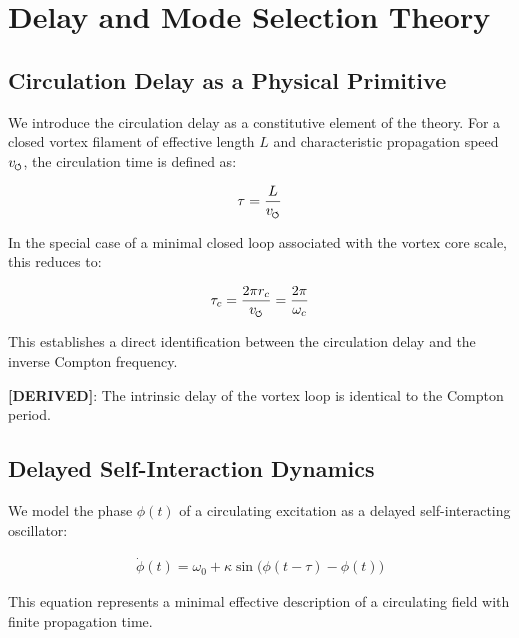 \section{Delay and Mode Selection Theory}
    \label{sec:delay}
    
    \subsection{Circulation Delay as a Physical Primitive}
        
        We introduce the circulation delay as a constitutive element of the theory.
        For a closed vortex filament of effective length $L$ and characteristic propagation speed $v_{\swirlarrow}$, the circulation time is defined as:
        
        \begin{align}
            \tau = \frac{L}{v_{\swirlarrow}}
            \label{eq:delay_time}
        \end{align}
        
        In the special case of a minimal closed loop associated with the vortex core scale, this reduces to:
        
        \begin{align}
            \tau_c = \frac{2\pi r_c}{v_{\swirlarrow}} = \frac{2\pi}{\omega_c}
            \label{eq:compton_delay}
        \end{align}
        
        This establishes a direct identification between the circulation delay and the inverse Compton frequency.
        
        \textbf{[DERIVED]}: The intrinsic delay of the vortex loop is identical to the Compton period.
    
    \subsection{Delayed Self-Interaction Dynamics}
        
        We model the phase $\phi(t)$ of a circulating excitation as a delayed self-interacting oscillator:
        
        \begin{align}
            \dot{\phi}(t) = \omega_0 + \kappa \sin\big(\phi(t - \tau) - \phi(t)\big)
            \label{eq:delay_phase}
        \end{align}
        
        This equation represents a minimal effective description of a circulating field with finite propagation time.
        
